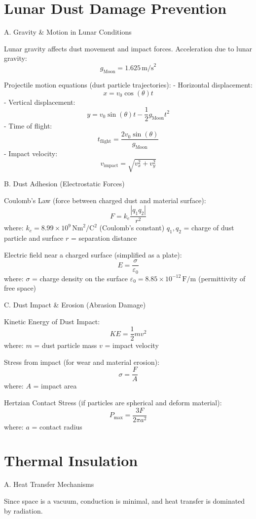 \documentclass{article}
\begin{document}
\section{Lunar Dust Damage Prevention}

A. Gravity \& Motion in Lunar Conditions

Lunar gravity affects dust movement and impact forces.  
Acceleration due to lunar gravity:  
\[
g_{\text{Moon}} = 1.625 \, \text{m/s}^2
\]

Projectile motion equations (dust particle trajectories):
- Horizontal displacement: 
  \[
  x = v_0 \cos(\theta) t
  \]
- Vertical displacement:
  \[
  y = v_0 \sin(\theta) t - \frac{1}{2} g_{\text{Moon}} t^2
  \]
- Time of flight:
  \[
  t_{\text{flight}} = \frac{2 v_0 \sin(\theta)}{g_{\text{Moon}}}
  \]
- Impact velocity:
  \[
  v_{\text{impact}} = \sqrt{v_x^2 + v_y^2}
  \]

B. Dust Adhesion (Electrostatic Forces)

Coulomb’s Law (force between charged dust and material surface):
\[
F = k_e \frac{|q_1 q_2|}{r^2}
\]
where:  
\( k_e = 8.99 \times 10^9 \, \text{Nm}^2/\text{C}^2 \) (Coulomb’s constant)  
\( q_1, q_2 \) = charge of dust particle and surface  
\( r \) = separation distance  

Electric field near a charged surface (simplified as a plate):
\[
E = \frac{\sigma}{\varepsilon_0}
\]
where:  
\( \sigma \) = charge density on the surface  
\( \varepsilon_0 = 8.85 \times 10^{-12} \, \text{F/m} \) (permittivity of free space)

C. Dust Impact \& Erosion (Abrasion Damage)

Kinetic Energy of Dust Impact:
\[
KE = \frac{1}{2} m v^2
\]
where:  
\( m \) = dust particle mass  
\( v \) = impact velocity

Stress from impact (for wear and material erosion):
\[
\sigma = \frac{F}{A}
\]
where:  
\( A \) = impact area

Hertzian Contact Stress (if particles are spherical and deform material):
\[
P_{\text{max}} = \frac{3F}{2 \pi a^2}
\]
where:  
\( a \) = contact radius

\section{Thermal Insulation}

A. Heat Transfer Mechanisms

Since space is a vacuum, conduction is minimal, and heat transfer is dominated by radiation.
\end{document}
